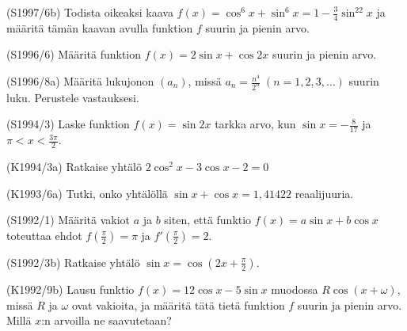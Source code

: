 \begin{tehtava} (S1997/6b)
	Todista oikeaksi kaava $f(x)=\cos^6x+\sin^6x=1-\frac{3}{4}\sin^22x$ ja määritä tämän kaavan avulla funktion $f$ 
	suurin ja pienin arvo.
\end{tehtava}

\begin{tehtava} (S1996/6)
	Määritä funktion $f(x)=2\sin x+\cos2x$ suurin ja pienin arvo.
\end{tehtava}

\begin{tehtava} (S1996/8a)
	Määritä lukujonon $(a_n)$, missä $a_n=\frac{n^4}{2^n} \; (n=1,2,3,\ldots)$ suurin luku. Perustele vastauksesi.
\end{tehtava}

\begin{tehtava} (S1994/3)
	Laske funktion $f(x)=\sin2x$ tarkka arvo, kun $\sin x=-\frac{8}{17}$ ja $\pi<x<\frac{3\pi}{2}$.
\end{tehtava}

\begin{tehtava} (K1994/3a)
	Ratkaise yhtälö $2\cos^2x-3\cos x-2=0$
\end{tehtava}

\begin{tehtava} (K1993/6a)
	Tutki, onko yhtälöllä $\sin x+\cos x=1,41422$ reaalijuuria.
\end{tehtava}

\begin{tehtava} (S1992/1)
	Määritä vakiot $a$ ja $b$ siten, että funktio $f(x)=a\sin x+b\cos x$ toteuttaa ehdot $f(\frac{\pi}{2})=\pi$ 
	ja $f'(\frac{\pi}{2})=2$.
\end{tehtava}

\begin{tehtava} (S1992/3b)
	Ratkaise yhtälö $\sin x=\cos(2x+\frac{\pi}{2})$.
\end{tehtava}

\begin{tehtava} (K1992/9b)
	Lausu funktio $f(x)=12\cos x-5\sin x$ muodossa $R\cos(x+\omega)$, missä $R$ ja $\omega$ ovat vakioita, ja 
	määritä tätä tietä funktion $f$ suurin ja pienin arvo. Millä $x$:n arvoilla ne saavutetaan?
\end{tehtava}

